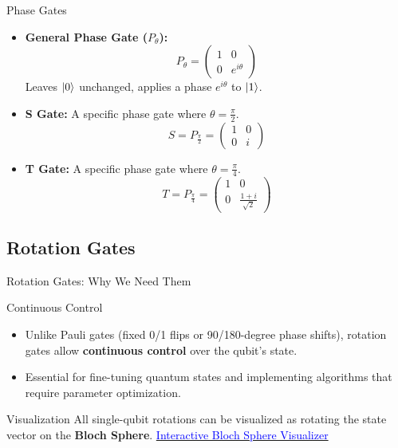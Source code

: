 \documentclass{beamer}
\begin{document}
\begin{frame}[fragile]{Phase Gates}
    \begin{itemize}
        \item \textbf{General Phase Gate ($P_{\theta}$):}
        \[ P_{\theta} = \begin{pmatrix} 1 & 0 \\ 0 & e^{i \theta}\end{pmatrix} \]
        Leaves $\ket{0}$ unchanged, applies a phase $e^{i\theta}$ to $\ket{1}$.
        \item \textbf{S Gate:} A specific phase gate where $\theta = \frac{\pi}{2}$.
        \[ S = P_{\frac{\pi}{2}} = \begin{pmatrix} 1 & 0 \\ 0 & i\end{pmatrix} \]
        \item \textbf{T Gate:} A specific phase gate where $\theta = \frac{\pi}{4}$.
        \[ T = P_{\frac{\pi}{4}} = \begin{pmatrix} 1 & 0 \\ 0 & \frac{1+i}{\sqrt{2}}\end{pmatrix} \]
    \end{itemize}
\end{frame}

\subsection{Rotation Gates}
\begin{frame}[fragile]{Rotation Gates: Why We Need Them}
    \begin{block}{Continuous Control}
        \begin{itemize}
            \item Unlike Pauli gates (fixed 0/1 flips or 90/180-degree phase shifts), rotation gates allow \textbf{continuous control} over the qubit's state.
            \item Essential for fine-tuning quantum states and implementing algorithms that require parameter optimization.
        \end{itemize}
    \end{block}
    
    \begin{alertblock}{Visualization}
        All single-qubit rotations can be visualized as rotating the state vector on the \textbf{Bloch Sphere}.
        \newline \href{https://bloch.kherb.io/}{\textcolor{blue}{Interactive Bloch Sphere Visualizer}}
    \end{alertblock}
\end{frame}
\end{document}
